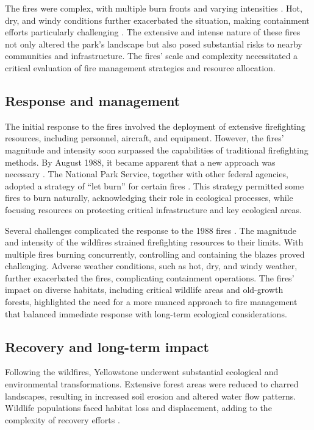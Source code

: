 \documentclass[
  12 pt,
]{Nemilov}
\begin{document}
The fires were complex, with multiple burn fronts and varying intensities \citep{turner2003surprises}. Hot, dry, and windy conditions further exacerbated the situation, making containment efforts particularly challenging \citep{van1991evolution}. The extensive and intense nature of these fires not only altered the park's landscape but also posed substantial risks to nearby communities and infrastructure. The fires' scale and complexity necessitated a critical evaluation of fire management strategies and resource allocation.

\subsection{Response and management}\label{response-and-management}

The initial response to the fires involved the deployment of extensive firefighting resources, including personnel, aircraft, and equipment. However, the fires' magnitude and intensity soon surpassed the capabilities of traditional firefighting methods. By August 1988, it became apparent that a new approach was necessary \citep{christensen1989interpreting, elfring1989yellowstone}. The National Park Service, together with other federal agencies, adopted a strategy of ``let burn'' for certain fires \citep{barker2013scorched}. This strategy permitted some fires to burn naturally, acknowledging their role in ecological processes, while focusing resources on protecting critical infrastructure and key ecological areas.

Several challenges complicated the response to the 1988 fires \citep{turner2003surprises}. The magnitude and intensity of the wildfires strained firefighting resources to their limits. With multiple fires burning concurrently, controlling and containing the blazes proved challenging. Adverse weather conditions, such as hot, dry, and windy weather, further exacerbated the fires, complicating containment operations. The fires' impact on diverse habitats, including critical wildlife areas and old-growth forests, highlighted the need for a more nuanced approach to fire management that balanced immediate response with long-term ecological considerations.

\subsection{Recovery and long-term impact}\label{recovery-and-long-term-impact}

Following the wildfires, Yellowstone underwent substantial ecological and environmental transformations. Extensive forest areas were reduced to charred landscapes, resulting in increased soil erosion and altered water flow patterns. Wildlife populations faced habitat loss and displacement, adding to the complexity of recovery efforts \citep{minshall1989wildfires, pearson1995winter, turner1994effects}.
\end{document}

